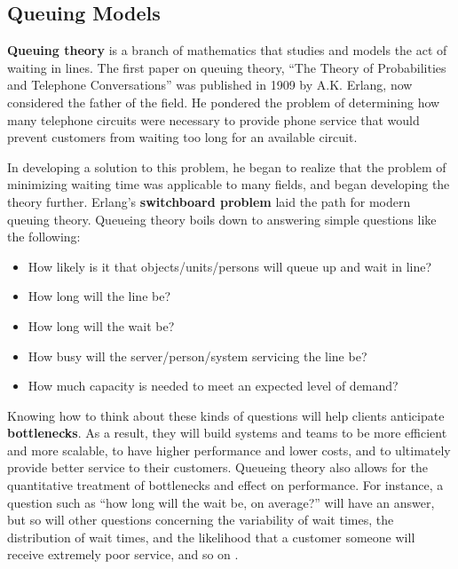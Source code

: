 \subsection{Queuing Models}
\label{sec:QM}



\textbf{Queuing theory} is a branch of mathematics that studies and models the act of waiting in lines.  The first paper on queuing theory, ``The Theory of Probabilities and Telephone Conversations'' was published in 1909 by A.K. Erlang, now considered the father of the field.  He pondered the problem of determining how many telephone circuits were necessary to provide phone service that would prevent customers
from waiting too long for an available circuit. \par In developing a solution to this problem, he began to realize that the problem of minimizing waiting time was applicable to many fields, and began developing the theory further. Erlang's \textbf{switchboard problem} laid the path for modern queuing theory.\newl 
Queueing theory boils down to answering simple questions like the following:
\begin{itemize}[noitemsep]
\item How likely is it that objects/units/persons will queue up and wait in line?
\item How long will the line be?
\item How long will the wait be?
\item How busy will the server/person/system servicing the line be?
\item How much capacity is needed to meet an expected level of demand?
\end{itemize}
Knowing how to think about these kinds of questions will help clients anticipate \textbf{bottlenecks}. As a result, they will build systems and teams to be more efficient and more scalable, to have higher performance and lower costs, and to ultimately provide better service to their customers. \newl Queueing theory also allows for the quantitative treatment of bottlenecks and effect on performance. For instance, a question such as ``how long will the wait be, on average?'' will have an answer, but so will other questions concerning the variability of wait times, the distribution of wait times, and the likelihood that a customer someone will receive extremely poor service, and so on \cite{QS_K1}.
